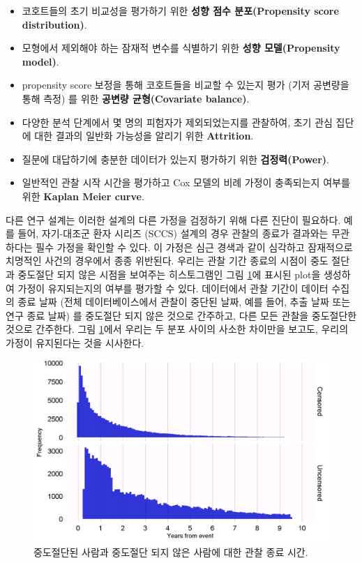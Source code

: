 \documentclass[10.5pt]{book}
\providecommand{\tightlist}{%
  \setlength{\itemsep}{0pt}\setlength{\parskip}{0pt}}
\theoremstyle{definition}
\theoremstyle{definition}
\theoremstyle{definition}
\theoremstyle{remark}
\begin{document}
\begin{itemize}
\tightlist
\item
  코호트들의 초기 비교성을 평가하기 위한 \textbf{성향 점수
  분포(Propensity score distribution)}.
\item
  모형에서 제외해야 하는 잠재적 변수를 식별하기 위한 \textbf{성향
  모델(Propensity model)}.
\item
  propensity score 보정을 통해 코호트들을 비교할 수 있는지 평가 (기저
  공변량을 통해 측정) 를 위한 \textbf{공변량 균형(Covariate balance)}.
\item
  다양한 분석 단계에서 몇 명의 피험자가 제외되었는지를 관찰하여, 초기
  관심 집단에 대한 결과의 일반화 가능성을 알리기 위한
  \textbf{Attrition}.
\item
  질문에 대답하기에 충분한 데이터가 있는지 평가하기 위한
  \textbf{검정력(Power)}.
\item
  일반적인 관찰 시작 시간을 평가하고 Cox 모델의 비례 가정이 충족되는지
  여부를 위한 \textbf{Kaplan Meier curve}.
\end{itemize}

다른 연구 설계는 이러한 설계의 다른 가정을 검정하기 위해 다른 진단이
필요하다. 예를 들어, 자기-대조군 환자 시리즈 (SCCS) 설계의 경우 관찰의
종료가 결과와는 무관하다는 필수 가정을 확인할 수 있다. 이 가정은 심근
경색과 같이 심각하고 잠재적으로 치명적인 사건의 경우에서 종종 위반된다.
우리는 관찰 기간 종료의 시점이 중도 절단과 중도절단 되지 않은 시점을
보여주는 히스토그램인 그림 \ref{fig:timeToObsEnd}에 표시된 plot을
생성하여 가정이 유지되는지의 여부를 평가할 수 있다. 데이터에서 관찰
기간이 데이터 수집의 종료 날짜 (전체 데이터베이스에서 관찰이 중단된
날짜, 예를 들어, 추출 날짜 또는 연구 종료 날짜) 를 중도절단 되지 않은
것으로 간주하고, 다른 모든 관찰을 중도절단한 것으로 간주한다. 그림
\ref{fig:timeToObsEnd}에서 우리는 두 분포 사이의 사소한 차이만을 보고도,
우리의 가정이 유지된다는 것을 시사한다.

\begin{figure}

{\centering \includegraphics[width=1\linewidth]{images/MethodValidity/timeToObsEnd} 

}

\caption{중도절단된 사람과 중도절단 되지 않은 사람에 대한 관찰 종료 시간.}\label{fig:timeToObsEnd}
\end{figure}
\end{document}
